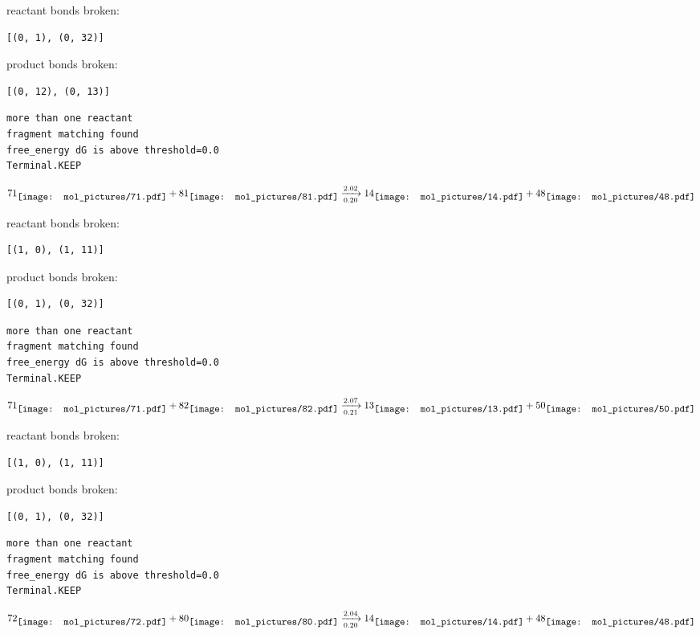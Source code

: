 \documentclass{article}
\begin{document}
reactant bonds broken:\begin{verbatim}
[(0, 1), (0, 32)]
\end{verbatim}
product bonds broken:\begin{verbatim}
[(0, 12), (0, 13)]
\end{verbatim}




\vspace{1cm}
\begin{verbatim}
more than one reactant
fragment matching found
free_energy dG is above threshold=0.0
Terminal.KEEP
\end{verbatim}
$$
71
\raisebox{-.5\height}{\texttt{[image: mol\_pictures/71.pdf]}}
+
81
\raisebox{-.5\height}{\texttt{[image: mol\_pictures/81.pdf]}}
\xrightarrow[0.20]{2.02}
14
\raisebox{-.5\height}{\texttt{[image: mol\_pictures/14.pdf]}}
+
48
\raisebox{-.5\height}{\texttt{[image: mol\_pictures/48.pdf]}}
$$


reactant bonds broken:\begin{verbatim}
[(1, 0), (1, 11)]
\end{verbatim}
product bonds broken:\begin{verbatim}
[(0, 1), (0, 32)]
\end{verbatim}




\vspace{1cm}
\begin{verbatim}
more than one reactant
fragment matching found
free_energy dG is above threshold=0.0
Terminal.KEEP
\end{verbatim}
$$
71
\raisebox{-.5\height}{\texttt{[image: mol\_pictures/71.pdf]}}
+
82
\raisebox{-.5\height}{\texttt{[image: mol\_pictures/82.pdf]}}
\xrightarrow[0.21]{2.07}
13
\raisebox{-.5\height}{\texttt{[image: mol\_pictures/13.pdf]}}
+
50
\raisebox{-.5\height}{\texttt{[image: mol\_pictures/50.pdf]}}
$$


reactant bonds broken:\begin{verbatim}
[(1, 0), (1, 11)]
\end{verbatim}
product bonds broken:\begin{verbatim}
[(0, 1), (0, 32)]
\end{verbatim}




\vspace{1cm}
\begin{verbatim}
more than one reactant
fragment matching found
free_energy dG is above threshold=0.0
Terminal.KEEP
\end{verbatim}
$$
72
\raisebox{-.5\height}{\texttt{[image: mol\_pictures/72.pdf]}}
+
80
\raisebox{-.5\height}{\texttt{[image: mol\_pictures/80.pdf]}}
\xrightarrow[0.20]{2.04}
14
\raisebox{-.5\height}{\texttt{[image: mol\_pictures/14.pdf]}}
+
48
\raisebox{-.5\height}{\texttt{[image: mol\_pictures/48.pdf]}}
$$
\end{document}
